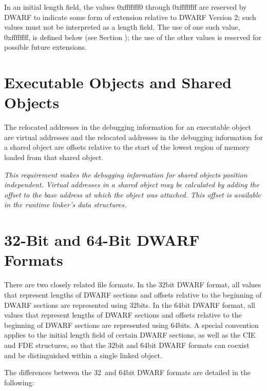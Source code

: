 In an initial length field, the values 0xfffffff0 through
0xffffffff are reserved by DWARF to indicate some form of
extension relative to DWARF Version 2; such values must not
be interpreted as a length field. The use of one such value,
0xffffffff, is defined below 
(see Section ); 
the use of
the other values is reserved for possible future extensions.



\section{Executable Objects and Shared Objects} 
\label{datarep:executableobjectsandsharedobjects}

The relocated addresses in the debugging information for an
executable object are virtual addresses and the relocated
addresses in the debugging information for a shared object
are offsets relative to the start of the lowest region of
memory loaded from that shared object.

\textit{This requirement makes the debugging information for
shared objects position independent.  Virtual addresses in a
shared object may be calculated by adding the offset to the
base address at which the object was attached. This offset
is available in the run\dash time linker’s data structures.}



\section{32-Bit and 64-Bit DWARF Formats}
\label{datarep:32bitand64bitdwarfformats}

There are two closely related file formats. In the 32\dash bit DWARF
format, all values that represent lengths of DWARF sections
and offsets relative to the beginning of DWARF sections are
represented using 32\dash bits. In the 64\dash bit DWARF format, all
values that represent lengths of DWARF sections and offsets
relative to the beginning of DWARF sections are represented
using 64\dash bits. A special convention applies to the initial
length field of certain DWARF sections, as well as the CIE and
FDE structures, so that the 32\dash bit and 64\dash bit DWARF formats
can coexist and be distinguished within a single linked object.

The differences between the 32\dash\   and 64\dash bit 
DWARF formats are
detailed in the following:


